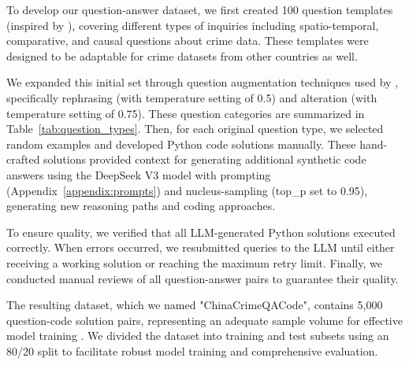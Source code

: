To develop our question-answer dataset, we first created 100 question templates (inspired by \cite{Dai2024QASTKG, Contractor2020QATourism}),  covering different types of inquiries including spatio-temporal, comparative, and causal questions about crime data. These templates were designed to be adaptable for crime datasets from other countries as well.

We expanded this initial set through question augmentation techniques used by \cite{Yin2024MuMathCode, Li2024MuggleMath, Jain2024MetaFineTuning}, specifically rephrasing (with temperature setting of 0.5) and alteration (with temperature setting of 0.75). These question categories are summarized in Table~\ref{tab:question_types}. Then, for each original question type, we selected random examples and developed Python code solutions manually. These hand-crafted solutions provided context for generating additional synthetic code answers using the DeepSeek V3 model with prompting (Appendix~\ref{appendix:prompts}) and nucleus-sampling \cite{Holtzman2020NucleusSampling, Ahmad2025OCRNVidia, Nvidia2024KaggleMath} (top\_p set to 0.95), generating new reasoning paths and coding approaches.


To ensure quality, we verified that all LLM-generated Python solutions executed correctly. When errors occurred, we resubmitted queries to the LLM until either receiving a working solution or reaching the maximum retry limit. Finally, we conducted manual reviews of all question-answer pairs to guarantee their quality.

The resulting dataset, which we named "ChinaCrimeQACode", contains 5,000 question-code solution pairs, representing an adequate sample volume for effective model training \cite{Unsloth2024Dataset1}. We divided the dataset into training and test subsets using an 80/20 split to facilitate robust model training and comprehensive evaluation.     %



